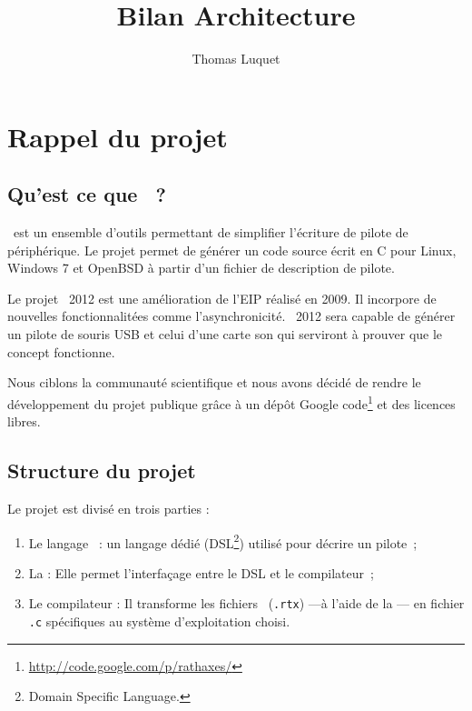 \documentclass{rtxreport}
\author{Thomas Luquet}
\title{Bilan Architecture}
\begin{document}
\maketitle

\rtxmaketitleblock

\tableofcontents

\chapter{Rappel du projet}

\section{Qu'est ce que \rtx\ ?}

\rtx\ est un ensemble d'outils permettant de simplifier l'écriture de pilote de
périphérique. Le projet permet de générer un code source écrit en C pour Linux,
Windows 7 et OpenBSD à partir d'un fichier de description de pilote.

Le projet \rtx\ 2012 est une amélioration de l'EIP réalisé en 2009. Il
incorpore de nouvelles fonctionnalitées comme l’asynchronicité. \rtx\ 2012 sera
capable de générer un pilote de souris USB et celui d'une carte son qui
serviront à prouver que le concept fonctionne.

Nous ciblons la communauté scientifique et nous avons décidé de rendre le
développement du projet publique grâce à un dépôt Google
code\footnote{\url{http://code.google.com/p/rathaxes/}} et des licences libres.

\section{Structure du projet}

Le projet est divisé en trois parties :
\begin{enumerate}
\item Le langage \rtx\ : un langage dédié (DSL\footnote{Domain Specific
Language.}) utilisé pour décrire un pilote~;
\item La \BL: Elle permet l'interfaçage entre le DSL et le compilateur~;
\item Le compilateur : Il transforme les fichiers \rtx\ (\texttt{.rtx}) ---à
l'aide de la \BL--- en fichier \texttt{.c} spécifiques au système d'exploitation
choisi.
\end{enumerate}
\end{document}
